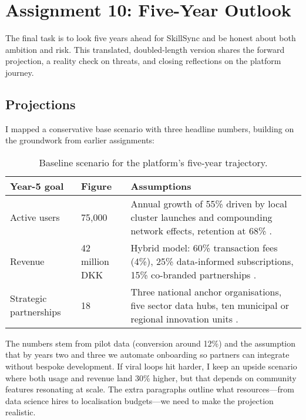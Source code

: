 \section*{Assignment 10: Five-Year Outlook}

The final task is to look five years ahead for SkillSync and be honest about both ambition and risk. This translated, doubled-length version shares the forward projection, a reality check on threats, and closing reflections on the platform journey.

\subsection*{Projections}
I mapped a conservative base scenario with three headline numbers, building on the groundwork from earlier assignments:\newline
\begin{table}[h]
  \centering
  \begin{tabular}{p{3cm}p{3.5cm}p{6cm}}
    \toprule
    \textbf{Year-5 goal} & \textbf{Figure} & \textbf{Assumptions} \\
    \midrule
    Active users & 75,000 & Annual growth of 55\% driven by local cluster launches and compounding network effects, retention at 68\% \citep{Choudary2016,Srnicek2017}. \\
    Revenue & 42 million DKK & Hybrid model: 60\% transaction fees (4\%), 25\% data-informed subscriptions, 15\% co-branded partnerships \citep{ShapiroVarian1999}. \\
    Strategic partnerships & 18 & Three national anchor organisations, five sector data hubs, ten municipal or regional innovation units \citep{Reillier2017}. \\
    \bottomrule
  \end{tabular}
  \caption{Baseline scenario for the platform’s five-year trajectory.}
\end{table}

The numbers stem from pilot data (conversion around 12\%) and the assumption that by years two and three we automate onboarding so partners can integrate without bespoke development. If viral loops hit harder, I keep an upside scenario where both usage and revenue land 30\% higher, but that depends on community features resonating at scale. The extra paragraphs outline what resources---from data science hires to localisation budgets---we need to make the projection realistic.

